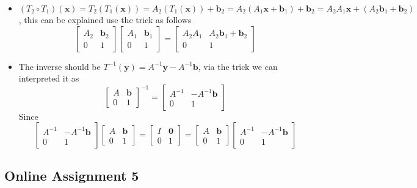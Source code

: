 \documentclass[a4paper,10pt]{article}
\begin{document}
\begin{solution}
\begin{itemize}
\item $(T_2\circ T_1)(\mathbf x)=T_2(T_1(\mathbf x))=A_2(T_1(\mathbf x))+\mathbf b_2=A_2(A_1\mathbf x+\mathbf b_1)+\mathbf b_2=A_2A_1\mathbf x+(A_2\mathbf b_1+\mathbf b_2)$, this can be explained use the trick as follows
\[
\begin{bmatrix}A_2&\mathbf b_2\\0&1\end{bmatrix}\begin{bmatrix}A_1&\mathbf b_1\\0&1\end{bmatrix}=\begin{bmatrix}A_2A_1&A_2\mathbf b_1+\mathbf b_2\\0&1\end{bmatrix}
\]
\item The inverse should be $T^{-1}(\mathbf y)=A^{-1}\mathbf y-A^{-1}\mathbf b$, via the trick we can interpreted it as
\[
\begin{bmatrix}A&\mathbf b\\0&1\end{bmatrix}^{-1}=\begin{bmatrix}A^{-1}&-A^{-1}\mathbf b\\0&1\end{bmatrix}
\]
Since
\[
\begin{bmatrix}A^{-1}&-A^{-1}\mathbf b\\0&1\end{bmatrix}\begin{bmatrix}A&\mathbf b\\0&1\end{bmatrix}=\begin{bmatrix}I&\mathbf 0\\0&1\end{bmatrix}=\begin{bmatrix}A&\mathbf b\\0&1\end{bmatrix}\begin{bmatrix}A^{-1}&-A^{-1}\mathbf b\\0&1\end{bmatrix}
\]
\end{itemize}
\end{solution}

\subsection{Online Assignment 5}
\end{document}
